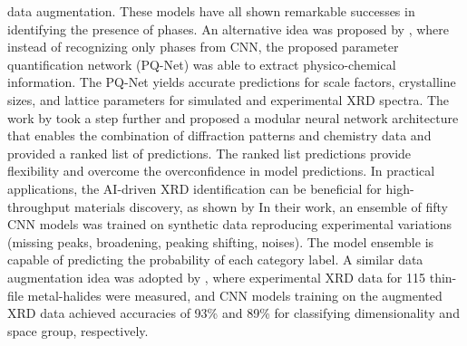 \documentclass[pdflatex,sn-mathphys]{sn-jnl}%
\theoremstyle{thmstyleone}%
\theoremstyle{thmstyletwo}%
\theoremstyle{thmstylethree}%
\begin{document}
data augmentation. These models have all shown remarkable successes in identifying the presence of phases. An alternative idea was proposed by \cite{Dong.7}, where instead of recognizing only phases from CNN, the proposed parameter quantification network (PQ-Net) was able to extract physico-chemical information. The PQ-Net yields accurate predictions for scale factors, crystalline sizes, and lattice parameters for simulated and experimental XRD spectra. The work by \cite{Aguiar.8} took a step further and proposed a modular neural network architecture that enables the combination of diffraction patterns and chemistry data and provided a ranked list of predictions. The ranked list predictions provide flexibility and overcome the overconfidence in model predictions. In practical applications, the AI-driven XRD identification can be beneficial for high-throughput materials discovery, as shown by \cite{Maffettone.9} In their work, an ensemble of fifty CNN models was trained on synthetic data reproducing experimental variations (missing peaks, broadening, peaking shifting, noises). The model ensemble is capable of predicting the probability of each category label. A similar data augmentation idea was adopted by \cite{Oviedo.10}, where experimental XRD data for 115 thin-file metal-halides were measured, and CNN models training on the augmented XRD data achieved accuracies of 93\% and 89\% for classifying dimensionality and space group, respectively. 
\end{document}
